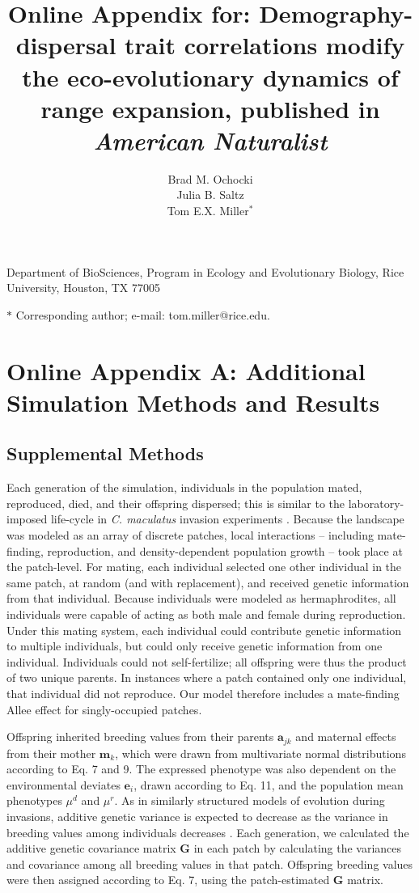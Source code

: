 \documentclass[11pt]{article}
\title{Online Appendix for: Demography-dispersal trait correlations modify the eco-evolutionary dynamics of range expansion, published in \textit{American Naturalist}}
\author{Brad M. Ochocki \\
Julia B. Saltz \\
Tom E.X. Miller$^{\ast}$}
\begin{document}
\maketitle

\noindent{} Department of BioSciences, Program in Ecology and Evolutionary Biology, Rice University, Houston, TX 77005

\noindent{} $\ast$ Corresponding author; e-mail: tom.miller@rice.edu.

\newpage{}

\section*{Online Appendix A: Additional Simulation Methods and Results}
\subsection*{Supplemental Methods}
Each generation of the simulation, individuals in the population mated, reproduced, died, and their offspring dispersed; this is similar to the laboratory-imposed life-cycle in \textit{C. maculatus} invasion experiments \citep{miller_sex_2013,wagner2017genetic,ochocki_rapid_2017}.
Because the landscape was modeled as an array of discrete patches, local interactions -- including mate-finding, reproduction, and density-dependent population growth -- took place at the patch-level.
For mating, each individual selected one other individual in the same patch, at random (and with replacement), and received genetic information from that individual.
Because individuals were modeled as hermaphrodites, all individuals were capable of acting as both male and female during reproduction.
Under this mating system, each individual could contribute genetic information to multiple individuals, but could only receive genetic information from one individual.
Individuals could not self-fertilize; all offspring were thus the product of two unique parents.
In instances where a patch contained only one individual, that individual did not reproduce.
Our model therefore includes a mate-finding Allee effect for singly-occupied patches.

Offspring inherited breeding values from their parents $\bm{a}_{jk}$ and maternal effects from their mother $\bm{m}_{k}$, which were drawn from multivariate normal distributions according to Eq. 7 and 9.
The expressed phenotype was also dependent on the environmental deviates $\bm{e}_{i}$, drawn according to Eq. 11, and the population mean phenotypes $\mu^{d}$ and $\mu^{r}$.
As in similarly structured models of evolution during invasions, additive genetic variance is expected to decrease as the variance in breeding values among individuals decreases \citep{phillips_evolutionary_2015}.
Each generation, we calculated the additive genetic covariance matrix $\bm{G}$ in each patch by calculating the variances and covariance among all breeding values in that patch.
Offspring breeding values were then assigned according to Eq. 7, using the patch-estimated $\bm{G}$ matrix.
\end{document}
